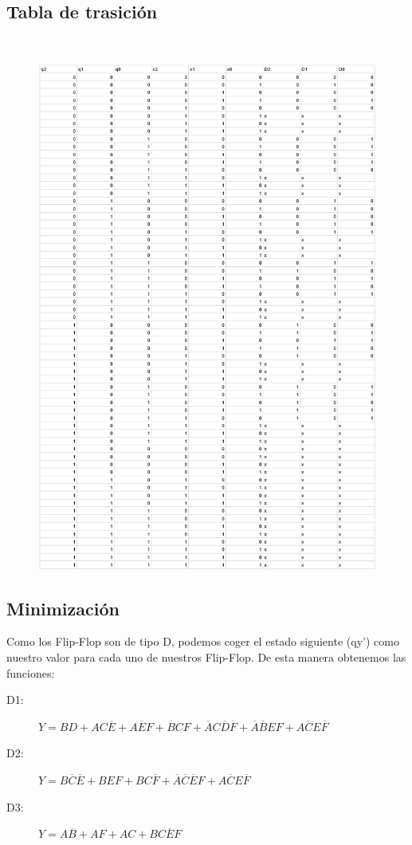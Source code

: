 \documentclass{article}
\begin{document}
\subsection{Tabla de trasición} 
\begin{figure}[!h]
    \centering
    \includegraphics[scale=0.73]{TABLA.PNG}
\end{figure}
\subsection{Minimización}
Como los Flip-Flop son de tipo D, podemos coger el estado siguiente (qy') como nuestro valor para cada uno de nuestros Flip-Flop. De esta manera obtenemos las funciones:
\begin{description}
    \item[D1: ]$Y=BD + AC\overline{E} + A\overline{E}F + \overline{B}CF + \overline{A}C\overline{D}\overline{F} + \overline{A}\overline{B}EF + A\overline{C}E\overline{F}$
    \item[D2: ]$Y=B\overline{C}\overline{E} + BEF + BC\overline{F} + \overline{A}\overline{C}\overline{E}F + A\overline{C}E\overline{F}$
    \item[D3: ]$Y=A\overline{B} + AF + AC + BC\overline{E}F$
\end{description}
\end{document}

